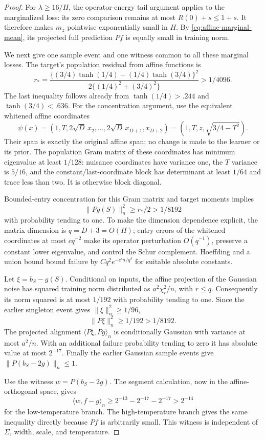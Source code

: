 \begin{proof}
For $\lambda\ge16/H$, the operator-energy tail argument applies to the marginalized loss: its zero comparison remains at most $\widehat R(0)+s\le1+s$. It therefore makes $m_z$ pointwise exponentially small in $H$. By \eqref{eq:affine-marginal-mean}, its projected full prediction $Pf$ is equally small in training norm.

We next give one sample event and one witness common to all these marginal losses. The target's population residual from affine functions is
\[
 r_*=
 \frac{\{(3/4)\tanh(1/4)-(1/4)\tanh(3/4)\}^2}
 {2\{(1/4)^2+(3/4)^2\}}>1/4096.
\]
The last inequality follows already from $\tanh(1/4)>.244$ and $\tanh(3/4)<.636$. For the concentration argument, use the equivalent whitened affine coordinates
\[
 \psi(x)=(1,T,2\sqrt D\,x_2,\ldots,2\sqrt D\,x_{D+1},x_{D+2})=(1,T,z,\sqrt{3/4-T^2}).
\] Their span is exactly the original affine span; no change is made to the learner or its prior. The population Gram matrix of these coordinates has minimum eigenvalue at least $1/128$: nuisance coordinates have variance one, the $T$ variance is $5/16$, and the constant/last-coordinate block has determinant at least $1/64$ and trace less than two. It is otherwise block diagonal.

Bounded-entry concentration for this Gram matrix and target moments implies
\[
 \|Pg(S)\|_n^2\ge r_*/2>1/8192
\]
with probability tending to one. To make the dimension dependence explicit, the matrix dimension is $q=D+3=O(H)$; entry errors of the whitened coordinates at most $c q^{-2}$ make its operator perturbation $O(q^{-1})$, preserve a constant lower eigenvalue, and control the Schur complement. Hoeffding and a union bound bound failure by $Cq^2e^{-c'n/q^4}$ for suitable absolute constants.

Let $\xi=b_S-g(S)$. Conditional on inputs, the affine projection of the Gaussian noise has squared training norm distributed as $a^2\chi^2_r/n$, with $r\le q$. Consequently its norm squared is at most $1/192$ with probability tending to one. Since the earlier singleton event gives $\|\xi\|_n^2\ge1/96$,
\[
 \|P\xi\|_n^2\ge1/192>1/8192.
\]
The projected alignment $\langle P\xi,Pg\rangle_n$ is conditionally Gaussian with variance at most $a^2/n$. With an additional failure probability tending to zero it has absolute value at most $2^{-17}$. Finally the earlier Gaussian sample events give $\|P(b_S-2g)\|_n\le1$.

Use the witness $w=P(b_S-2g)$. The segment calculation, now in the affine-orthogonal space, gives
\[
 \langle w,f-g\rangle_n
 \ge2^{-13}-2^{-17}-2^{-17}>2^{-14}
\]
for the low-temperature branch. The high-temperature branch gives the same inequality directly because $Pf$ is arbitrarily small. This witness is independent of $\Sigma$, width, scale, and temperature.


\end{proof}
